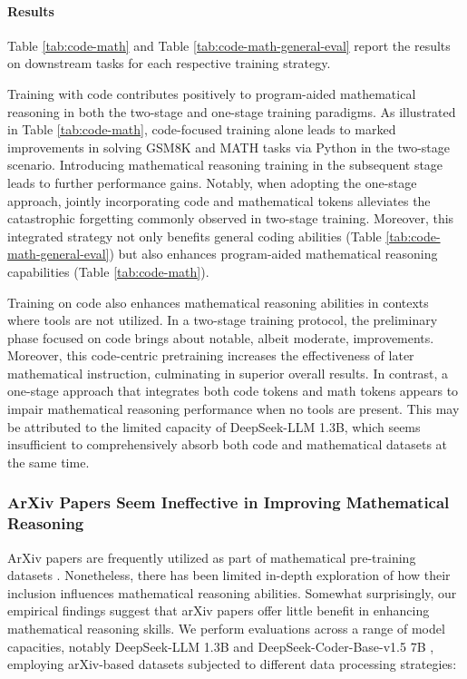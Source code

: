 \begin{itemize}[topsep=0pt]
\begin{itemize}[topsep=0pt]
\paragraph{Results}
Table \ref{tab:code-math} and Table \ref{tab:code-math-general-eval} report the results on downstream tasks for each respective training strategy.

Training with code contributes positively to program-aided mathematical reasoning in both the two-stage and one-stage training paradigms. As illustrated in Table \ref{tab:code-math}, code-focused training alone leads to marked improvements in solving GSM8K and MATH tasks via Python in the two-stage scenario. Introducing mathematical reasoning training in the subsequent stage leads to further performance gains. Notably, when adopting the one-stage approach, jointly incorporating code and mathematical tokens alleviates the catastrophic forgetting commonly observed in two-stage training. Moreover, this integrated strategy not only benefits general coding abilities (Table \ref{tab:code-math-general-eval}) but also enhances program-aided mathematical reasoning capabilities (Table \ref{tab:code-math}).

Training on code also enhances mathematical reasoning abilities in contexts where tools are not utilized. In a two-stage training protocol, the preliminary phase focused on code brings about notable, albeit moderate, improvements. Moreover, this code-centric pretraining increases the effectiveness of later mathematical instruction, culminating in superior overall results. In contrast, a one-stage approach that integrates both code tokens and math tokens appears to impair mathematical reasoning performance when no tools are present. This may be attributed to the limited capacity of DeepSeek-LLM 1.3B, which seems insufficient to comprehensively absorb both code and mathematical datasets at the same time.

\subsubsection{ArXiv Papers Seem Ineffective in Improving Mathematical Reasoning}

ArXiv papers are frequently utilized as part of mathematical pre-training datasets \citep{minerva,gpt-f,llemma,mathpile}. Nonetheless, there has been limited in-depth exploration of how their inclusion influences mathematical reasoning abilities. Somewhat surprisingly, our empirical findings suggest that arXiv papers offer little benefit in enhancing mathematical reasoning skills. We perform evaluations across a range of model capacities, notably DeepSeek-LLM 1.3B and DeepSeek-Coder-Base-v1.5 7B \citep{deepseek-coder}, employing arXiv-based datasets subjected to different data processing strategies:


\end{itemize}
\end{itemize}
